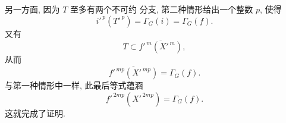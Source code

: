 另一方面, 因为 \(T\) 至多有两个不可约
分支, 第二种情形给出一个整数 \(p\), 使得
\[
  i'^{\,p}(T'^{\,p})
  =\Gamma_G(i)=\Gamma_G(f).
\]
又有
\[
  T\subset\overline{f'^{\,m}(X'^{\,m})},
\]
从而
\[
  \overline{f'^{\,mp}(X'^{\,mp})}=\Gamma_G(f).
\]
与第一种情形中一样, 此最后等式蕴涵
\[
  f'^{\,2mp}(X'^{\,2mp})=\Gamma_G(f).
\]
这就完成了证明.


